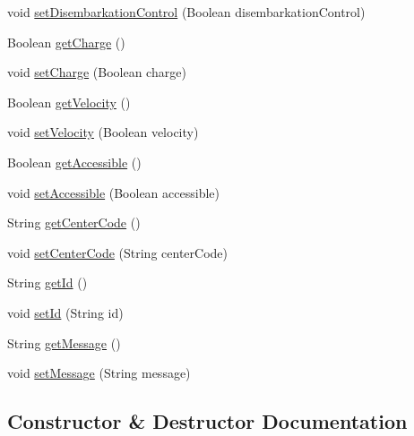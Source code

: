 \begin{DoxyCompactItemize}
void \mbox{\hyperlink{classcom_1_1osoc_1_1oncera_1_1javabean_1_1_stair_lifter_a98a4eb9d607a49134bc8efd169f89f63}{set\+Disembarkation\+Control}} (Boolean disembarkation\+Control)
\item 
Boolean \mbox{\hyperlink{classcom_1_1osoc_1_1oncera_1_1javabean_1_1_stair_lifter_a362d01302ee3d5a66360b7f90285259f}{get\+Charge}} ()
\item 
void \mbox{\hyperlink{classcom_1_1osoc_1_1oncera_1_1javabean_1_1_stair_lifter_a1a99579406a0f2eab28144daf4f370d0}{set\+Charge}} (Boolean charge)
\item 
Boolean \mbox{\hyperlink{classcom_1_1osoc_1_1oncera_1_1javabean_1_1_stair_lifter_a0a828c1717bf0aa65f8a6083bfc4fb8a}{get\+Velocity}} ()
\item 
void \mbox{\hyperlink{classcom_1_1osoc_1_1oncera_1_1javabean_1_1_stair_lifter_a0d51eb0e3f84b4f53f902ad9f5268c7f}{set\+Velocity}} (Boolean velocity)
\item 
Boolean \mbox{\hyperlink{classcom_1_1osoc_1_1oncera_1_1javabean_1_1_stair_lifter_a31bbcbe4ee4cf1db8e41c4135d2734e9}{get\+Accessible}} ()
\item 
void \mbox{\hyperlink{classcom_1_1osoc_1_1oncera_1_1javabean_1_1_stair_lifter_afbd63f7da8072b9776660e27ba53523c}{set\+Accessible}} (Boolean accessible)
\item 
String \mbox{\hyperlink{classcom_1_1osoc_1_1oncera_1_1javabean_1_1_stair_lifter_ac7887bd14c810ed2b456174b8733d939}{get\+Center\+Code}} ()
\item 
void \mbox{\hyperlink{classcom_1_1osoc_1_1oncera_1_1javabean_1_1_stair_lifter_a3f72391a4ffa3394059c391881cf0c9c}{set\+Center\+Code}} (String center\+Code)
\item 
String \mbox{\hyperlink{classcom_1_1osoc_1_1oncera_1_1javabean_1_1_stair_lifter_acd190546c7b747ffa2d9096cb74d7c3e}{get\+Id}} ()
\item 
void \mbox{\hyperlink{classcom_1_1osoc_1_1oncera_1_1javabean_1_1_stair_lifter_a97b489bc5bfc956bca10f9861eb71e9d}{set\+Id}} (String id)
\item 
String \mbox{\hyperlink{classcom_1_1osoc_1_1oncera_1_1javabean_1_1_stair_lifter_aa81f016a6a3b27732decc99a2a2ca615}{get\+Message}} ()
\item 
void \mbox{\hyperlink{classcom_1_1osoc_1_1oncera_1_1javabean_1_1_stair_lifter_aa265bce0dc9061c5dabd7b471d0a5a31}{set\+Message}} (String message)
\end{DoxyCompactItemize}


\subsection{Constructor \& Destructor Documentation}
\mbox{\label{classcom_1_1osoc_1_1oncera_1_1javabean_1_1_stair_lifter_a689f1dd487807d797271e55566e91778}} 
